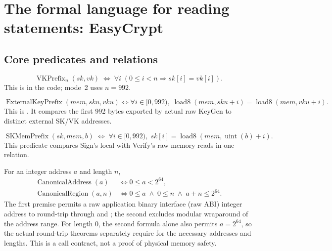 \section{The formal language for reading statements: EasyCrypt}
\label{sec:formal-language}

\subsection{Core predicates and relations}

\begin{definition}
\label{def:vk-prefix}
\[
  \operatorname{VKPrefix}_{n}(sk,vk)
  \;\Longleftrightarrow\;
  \forall i\;(0\le i<n\Rightarrow sk[i]=vk[i]).
\]
This is  in the code; mode~2 uses \(n=992\).
\end{definition}

\begin{definition}
\label{def:external-prefix}
\[
  \operatorname{ExternalKeyPrefix}(mem,sku,vku)
  \Longleftrightarrow
  \forall i\in[0,992),\;
  \operatorname{load8}(mem,sku+i)=\operatorname{load8}(mem,vku+i).
\]
This is . It compares the first
992 bytes exported by actual raw KeyGen to distinct external SK/VK addresses.
\end{definition}

\begin{definition}
\label{def:mem-prefix}
\[
  \operatorname{SKMemPrefix}(sk,mem,b)
  \;\Longleftrightarrow\;
  \forall i\in[0,992),\;
  sk[i]=\operatorname{load8}(mem,\operatorname{uint}(b)+i).
\]
This predicate compares Sign's local  with Verify's
raw-memory reads in one relation.
\end{definition}

\begin{definition}
\label{def:canonical-region}
For an integer address \(a\) and length \(n\),
\[
\begin{aligned}
  \operatorname{CanonicalAddress}(a)
    &\Longleftrightarrow 0\le a<2^{64},\\
  \operatorname{CanonicalRegion}(a,n)
    &\Longleftrightarrow
      0\le a\;\land\;0\le n\;\land\;a+n\le 2^{64}.
\end{aligned}
\]
The first premise permits a raw application binary interface (raw ABI)
integer address to round-trip through  and
; the second excludes modular wraparound of the address
range. For length 0, the second formula alone also permits \(a=2^{64}\), so the
actual round-trip theorems separately require 
for the necessary addresses and lengths. This is a call contract, not a proof
of physical memory safety.
\end{definition}

